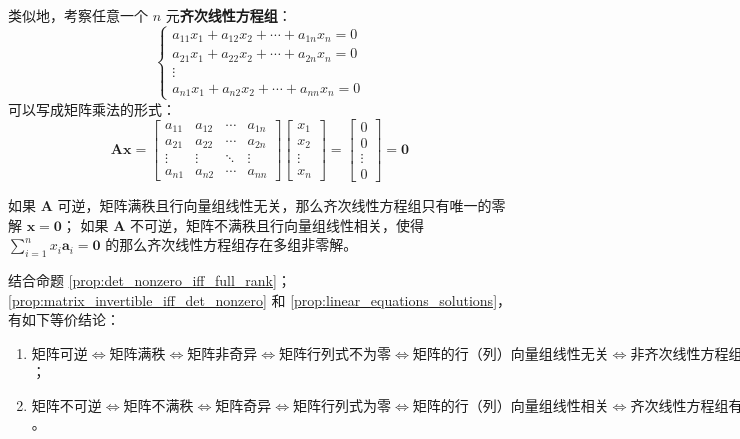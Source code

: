 类似地，考察任意一个 $n$ 元\textbf{齐次线性方程组}：
\[
    \begin{cases}
        a_{11}x_1 + a_{12}x_2 + \cdots + a_{1n}x_n = 0 \\
        a_{21}x_1 + a_{22}x_2 + \cdots + a_{2n}x_n = 0 \\
        \vdots \\
        a_{n1}x_1 + a_{n2}x_2 + \cdots + a_{nn}x_n = 0
    \end{cases}
\]
可以写成矩阵乘法的形式：
\[
    \mathbf{A}\mathbf{x} = \begin{bmatrix}
        a_{11} & a_{12} & \cdots & a_{1n} \\
        a_{21} & a_{22} & \cdots & a_{2n} \\
        \vdots & \vdots & \ddots & \vdots \\
        a_{n1} & a_{n2} & \cdots & a_{nn}
    \end{bmatrix}\begin{bmatrix}
        x_1 \\
        x_2 \\
        \vdots\\
        x_n
    \end{bmatrix}=
    \begin{bmatrix}
        0 \\
        0 \\
        \vdots\\
        0
    \end{bmatrix} = \mathbf{0}
\]

如果 $\mathbf{A}$ 可逆，矩阵满秩且行向量组线性无关，那么齐次线性方程组只有唯一的零解 $\mathbf{x} = \mathbf{0}$；
如果 $\mathbf{A}$ 不可逆，矩阵不满秩且行向量组线性相关，使得 $\sum^n_{i=1}x_i\mathbf{a}_i = \mathbf{0}$ 的那么齐次线性方程组存在多组非零解。

\begin{note}
    结合命题 \ref{prop:det_nonzero_iff_full_rank}；\ref{prop:matrix_invertible_iff_det_nonzero} 和 \ref{prop:linear_equations_solutions}，有如下等价结论：
    \begin{enumerate}
        \item $\text{矩阵可逆}\iff \text{矩阵满秩}\iff\text{矩阵非奇异}\iff\text{矩阵行列式不为零}\iff\text{矩阵的行（列）向量组线性无关}\iff \text{非齐次线性方程组有唯一非零解}$ ；
        \item $\text{矩阵不可逆} \iff \text{矩阵不满秩} \iff \text{矩阵奇异} \iff \text{矩阵行列式为零} \iff \text{矩阵的行（列）向量组线性相关}\iff \text{齐次线性方程组有存在非零解}$。
    \end{enumerate}
\end{note}

\newpage